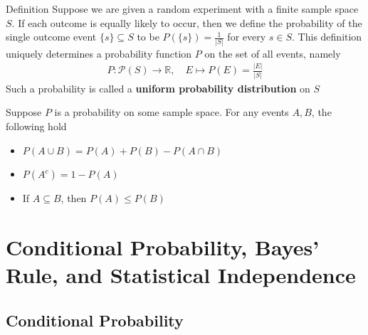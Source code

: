 \documentclass{report}
\begin{document}
\begin{enumerate}
		\begin{question}{Definition}
			Suppose we are given a random experiment with a finite sample space $S$. If each outcome is equally likely to occur, then we define the probability of the single outcome event $\{s\} \subseteq S$ to be $P(\{s\}) = \frac{1}{|S|}$ for every $s \in S$. This definition uniquely determines a probability function $P$ on the set of all events, namely
			\begin{align*}
				P: \mathcal{P}(S) \to \mathbb{R}, \quad E \mapsto P(E) = \frac{|E|}{|S|}
			\end{align*}
			Such a probability is called a \textbf{uniform probability distribution} on $S$
		\end{question}

		Suppose $P$ is a probability on some sample space. For any events $A,B$, the following hold
		\begin{itemize}
			\item $P(A \cup B) = P(A) + P(B) - P(A \cap B)$
			\item $P(A^c) = 1 - P(A)$
			\item If $A \subseteq B$, then $P(A) \leq P(B)$
		\end{itemize}

\chapter{Conditional Probability, Bayes' Rule, and Statistical Independence}

	\section{Conditional Probability}


\end{enumerate}
\end{document}

